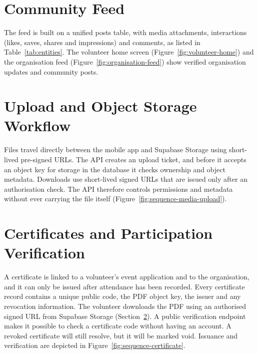 \section{Community Feed}
\label{sec:impl-feed}
The feed is built on a unified posts table, with media attachments, interactions (likes, saves, shares and impressions) and comments, as listed in Table~\ref{tab:entities}. The volunteer home screen (Figure~\ref{fig:volunteer-home}) and the organisation feed (Figure~\ref{fig:organisation-feed}) show verified organisation updates and community posts.

\section{Upload and Object Storage Workflow}
\label{sec:impl-uploads}
Files travel directly between the mobile app and Supabase Storage using short-lived pre-signed URLs. The API creates an upload ticket, and before it accepts an object key for storage in the database it checks ownership and object metadata. Downloads use short-lived signed URLs that are issued only after an authorisation check. The API therefore controls permissions and metadata without ever carrying the file itself (Figure~\ref{fig:sequence-media-upload}).


\section{Certificates and Participation Verification}
\label{sec:impl-certificates}
A certificate is linked to a volunteer's event application and to the organisation, and it can only be issued after attendance has been recorded. Every certificate record contains a unique public code, the PDF object key, the issuer and any revocation information. The volunteer downloads the PDF using an authorised signed URL from Supabase Storage (Section~\ref{sec:impl-uploads}). A public verification endpoint makes it possible to check a certificate code without having an account. A revoked certificate will still resolve, but it will be marked void. Issuance and verification are depicted in Figure~\ref{fig:sequence-certificate}.


